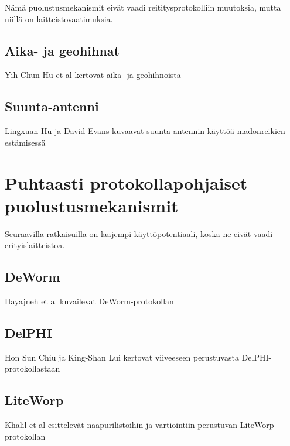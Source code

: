 \documentclass[finnish]{tktltiki2}
\theoremstyle{definition}
\theoremstyle{remark}
\begin{document}
Nämä puolustusmekanismit eivät vaadi reititysprotokolliin muutoksia, mutta niillä on laitteistovaatimuksia.

\subsection{Aika- ja geohihnat}
Yih-Chun Hu et al kertovat aika- ja geohihnoista \cite{leashes}
\subsection{Suunta-antenni}
Lingxuan Hu ja David Evans kuvaavat suunta-antennin käyttöä madonreikien estämisessä \cite{antenna}

\newpage
\section{Puhtaasti protokollapohjaiset puolustusmekanismit}
Seuraavilla ratkaisuilla on laajempi käyttöpotentiaali, koska ne eivät vaadi erityislaitteistoa.

\subsection{DeWorm}

Hayajneh et al kuvailevat DeWorm-protokollan \cite{deworm}

\subsection{DelPHI}

Hon Sun Chiu ja King-Shan Lui kertovat viiveeseen perustuvasta DelPHI-protokollastaan \cite{delphi}

\subsection{LiteWorp}

Khalil et al esittelevät naapurilistoihin ja vartiointiin perustuvan LiteWorp-protokollan \cite{liteworp}


%
%
%
\newpage

%






% 
\end{document}
